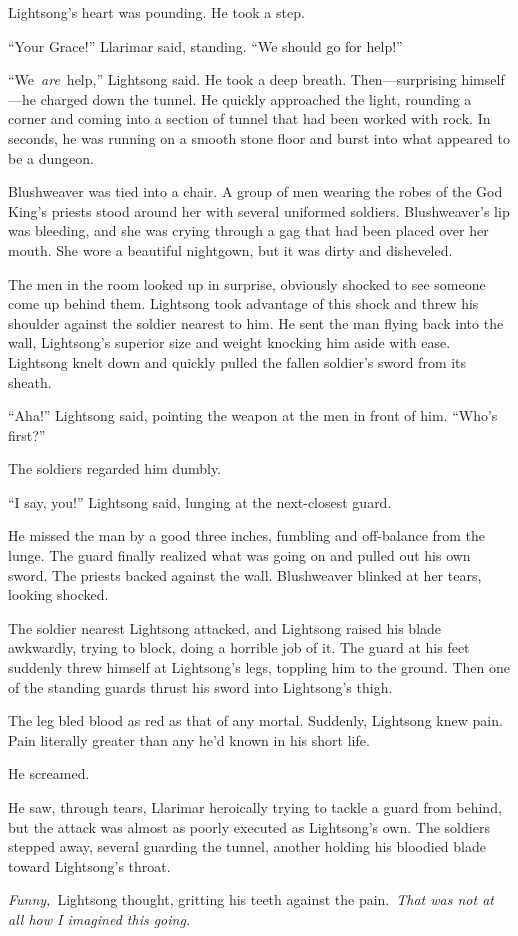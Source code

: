 Lightsong’s heart was pounding. He took a step.

“Your Grace!” Llarimar said, standing. “We should go for help!”

“We~\textit{are}~help,” Lightsong said. He took a deep breath. Then—surprising himself—he charged down the tunnel. He quickly approached the light, rounding a corner and coming into a section of tunnel that had been worked with rock. In seconds, he was running on a smooth stone floor and burst into what appeared to be a dungeon.

Blushweaver was tied into a chair. A group of men wearing the robes of the God King’s priests stood around her with several uniformed soldiers. Blushweaver’s lip was bleeding, and she was crying through a gag that had been placed over her mouth. She wore a beautiful nightgown, but it was dirty and disheveled.

The men in the room looked up in surprise, obviously shocked to see someone come up behind them. Lightsong took advantage of this shock and threw his shoulder against the soldier nearest to him. He sent the man flying back into the wall, Lightsong’s superior size and weight knocking him aside with ease. Lightsong knelt down and quickly pulled the fallen soldier’s sword from its sheath.

“Aha!” Lightsong said, pointing the weapon at the men in front of him. “Who’s first?”

The soldiers regarded him dumbly.

“I say, you!” Lightsong said, lunging at the next-closest guard.

He missed the man by a good three inches, fumbling and off-balance from the lunge. The guard finally realized what was going on and pulled out his own sword. The priests backed against the wall. Blushweaver blinked at her tears, looking shocked.

The soldier nearest Lightsong attacked, and Lightsong raised his blade awkwardly, trying to block, doing a horrible job of it. The guard at his feet suddenly threw himself at Lightsong’s legs, toppling him to the ground. Then one of the standing guards thrust his sword into Lightsong’s thigh.

The leg bled blood as red as that of any mortal. Suddenly, Lightsong knew pain. Pain literally greater than any he’d known in his short life.

He screamed.

He saw, through tears, Llarimar heroically trying to tackle a guard from behind, but the attack was almost as poorly executed as Lightsong’s own. The soldiers stepped away, several guarding the tunnel, another holding his bloodied blade toward Lightsong’s throat.

\textit{Funny,}~Lightsong thought, gritting his teeth against the pain.~\textit{That was not at all how I imagined this going.}

